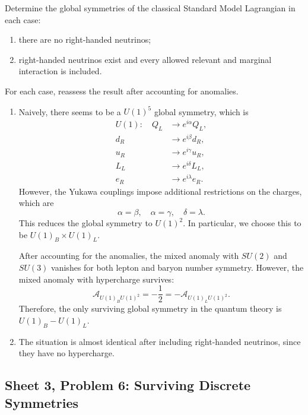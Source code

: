Determine the global symmetries of the classical Standard Model
Lagrangian in each case:
\begin{enumerate}[label=\roman*)]
    \item there are no right-handed neutrinos;
    \item right-handed neutrinos exist and every allowed relevant and
    marginal interaction is included.
\end{enumerate}
For each case, reassess the result after accounting for anomalies.
\begin{solution}
    \begin{enumerate}[label=\roman*)]
    \item Naively, there seems to be a $U(1)^5$ global symmetry, which is
    \begin{align}
        U(1):\quad Q_L &\to e^{i\alpha}Q_L,\\
         d_R &\to e^{i\beta}d_R,\\
         u_R &\to e^{i\gamma}u_R,\\
         L_L &\to e^{i\delta}L_L,\\
         e_R &\to e^{i\lambda}e_R.
    \end{align}
        However, the Yukawa couplings impose additional restrictions on the charges, which are
    \begin{equation}
        \alpha = \beta, \quad \alpha = \gamma, \quad \delta = \lambda.
    \end{equation}
    This reduces the global symmetry to $U(1)^2$. In particular, we choose this to be $U(1)_B \times U(1)_L$.

    After accounting for the anomalies, the mixed anomaly with $SU(2)$ and $SU(3)$ vanishes for both lepton and baryon number symmetry. However, the mixed anomaly with hypercharge survives:
    \begin{equation}
        \mathcal{A}_{U(1)_BU(1)^2} = -\frac{1}{2} = -\mathcal{A}_{U(1)_LU(1)^2}.
    \end{equation}
    Therefore, the only surviving global symmetry in the quantum theory is $U(1)_B - U(1)_L$.
        \item The situation is almost identical after including right-handed neutrinos, since they have no hypercharge.
    \end{enumerate}

\end{solution}

\subsection{Sheet 3, Problem 6: Surviving Discrete Symmetries}

